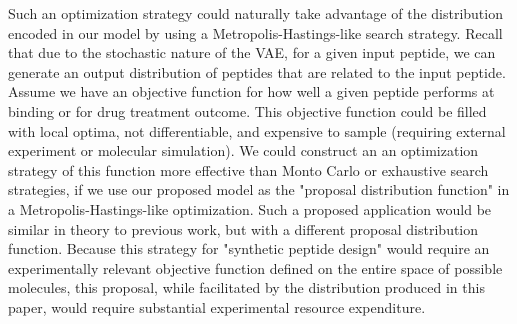\documentclass[preprint,12pt]{elsarticle}
\begin{document}
Such an optimization strategy could naturally take advantage of the distribution encoded in our model by using a Metropolis-Hastings-like search strategy. Recall that due to the stochastic nature of the VAE, for a given input peptide, we can generate an output distribution of peptides that are related to the input peptide. Assume we have an objective function for how well a given peptide performs at binding or for drug treatment outcome. This objective function could be filled with local optima, not differentiable, and expensive to sample (requiring external experiment or molecular simulation). We could construct an an optimization strategy of this function more effective than Monto Carlo or exhaustive search strategies, if we use our proposed model as the "proposal distribution function" in a Metropolis-Hastings-like optimization. Such a proposed application would be similar in theory to previous work, but with a different proposal distribution function\cite{giguere2013improved}. Because this strategy for "synthetic peptide design" would require an experimentally relevant objective function defined on the entire space of possible molecules, this proposal, while facilitated by the distribution produced in this paper, would require substantial experimental resource expenditure.









\end{document}
